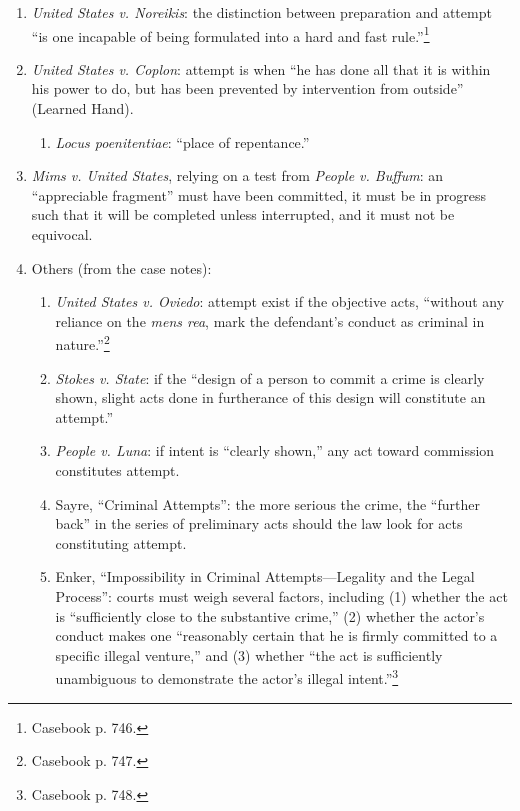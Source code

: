 \begin{enumerate}
    \item \emph{United States v. Noreikis}: the distinction between 
    preparation and attempt ``is one incapable of being formulated into a hard 
    and fast rule.''\footnote{Casebook p. 746.}
    \item \emph{United States v. Coplon}: attempt is when ``he has done all 
    that it is within his power to do, but has been prevented by intervention 
    from outside'' (Learned Hand).
    \begin{enumerate}
        \item \emph{Locus poenitentiae}: ``place of repentance.''
    \end{enumerate}
    \item \emph{Mims v. United States}, relying on a test from \emph{People v.  
    Buffum}: an ``appreciable fragment'' must have been committed, it must be 
    in progress such that it will be completed unless interrupted, and it must 
    not be equivocal.
    \item Others (from the case notes):
    \begin{enumerate}
        \item \emph{United States v. Oviedo}: attempt exist if the objective 
        acts, ``without any reliance on the \emph{mens rea}, mark the 
        defendant's conduct as criminal in nature.''\footnote{Casebook p.  
        747.}
        \item \emph{Stokes v. State}: if the ``design of a person to commit a 
        crime is clearly shown, slight acts done in furtherance of this design 
        will constitute an attempt.''
        \item \emph{People v. Luna}: if intent is ``clearly shown,'' any act 
        toward commission constitutes attempt.
        \item Sayre, ``Criminal Attempts'': the more serious the crime, the 
        ``further back'' in the series of preliminary acts should the law look 
        for acts constituting attempt.
        \item Enker, ``Impossibility in Criminal Attempts---Legality and the 
        Legal Process'': courts must weigh several factors, including (1) 
        whether the act is ``sufficiently close to the substantive crime,'' 
        (2) whether the actor's conduct makes one ``reasonably certain that he 
        is firmly committed to a specific illegal venture,'' and (3) whether 
        ``the act is sufficiently unambiguous to demonstrate the actor's 
        illegal intent.''\footnote{Casebook p. 748.}
    \end{enumerate}
\end{enumerate}

